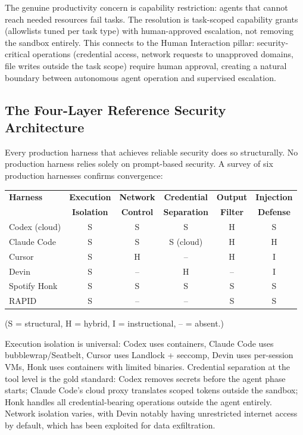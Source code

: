 The genuine productivity concern is capability restriction: agents that cannot reach needed resources fail tasks. The resolution is task-scoped capability grants (allowlists tuned per task type) with human-approved escalation, not removing the sandbox entirely. This connects to the Human Interaction pillar: security-critical operations (credential access, network requests to unapproved domains, file writes outside the task scope) require human approval, creating a natural boundary between autonomous agent operation and supervised escalation.

\subsection{The Four-Layer Reference Security Architecture}

Every production harness that achieves reliable security does so structurally. No production harness relies solely on prompt-based security. A survey of six production harnesses confirms convergence:

\begin{center}
\small
\begin{tabular}{lccccc}
\toprule
\textbf{Harness} & \textbf{Execution} & \textbf{Network} & \textbf{Credential} & \textbf{Output} & \textbf{Injection} \\
 & \textbf{Isolation} & \textbf{Control} & \textbf{Separation} & \textbf{Filter} & \textbf{Defense} \\
\midrule
Codex (cloud) & S & S & S & H & S \\
Claude Code & S & S & S (cloud) & H & H \\
Cursor & S & H & -- & H & I \\
Devin & S & -- & H & -- & I \\
Spotify Honk & S & S & S & S & S \\
RAPID & S & -- & -- & S & S \\
\bottomrule
\end{tabular}
\end{center}
\noindent\small{(S = structural, H = hybrid, I = instructional, -- = absent.)}

\normalsize
Execution isolation is universal: Codex uses containers, Claude Code uses bubblewrap/Seatbelt, Cursor uses Landlock + seccomp, Devin uses per-session VMs, Honk uses containers with limited binaries. Credential separation at the tool level is the gold standard: Codex removes secrets before the agent phase starts; Claude Code's cloud proxy translates scoped tokens outside the sandbox; Honk handles all credential-bearing operations outside the agent entirely. Network isolation varies, with Devin notably having unrestricted internet access by default, which has been exploited for data exfiltration.

